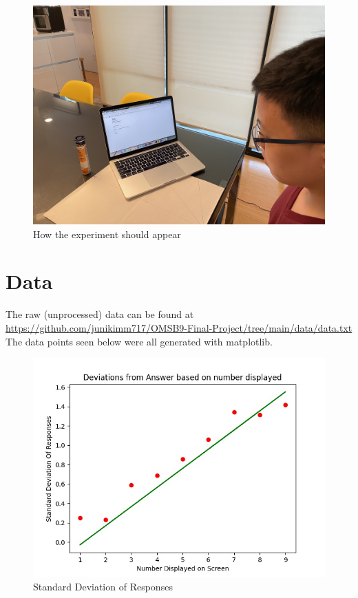 \documentclass[12pt]{article}
\begin{document}
\begin{figure}
\centering
\includegraphics[scale=0.3]{diagram.JPG}
\caption{How the experiment should appear}
\end{figure}

\section{Data}
The raw (unprocessed) data can be found at \\
\url{https://github.com/junikimm717/OMSB9-Final-Project/tree/main/data/data.txt}
The data points seen below were all generated with matplotlib.

\begin{figure} [h]
\centering
\includegraphics[scale=0.5]{regression.jpg}
\caption{Standard Deviation of Responses}
\end{figure}
\end{document}
